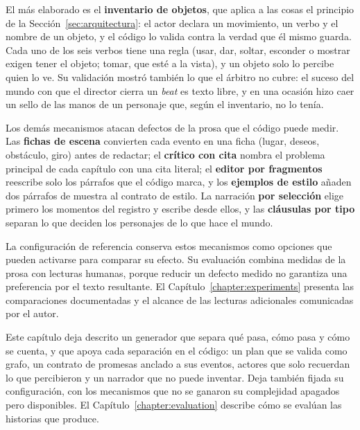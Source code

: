 El más elaborado es el \textbf{inventario de objetos}, que aplica a las cosas el principio de la
Sección~\ref{sec:arquitectura}: el actor declara un movimiento, un verbo y el nombre de un objeto, y
el código lo valida contra la verdad que él mismo guarda. Cada uno de los seis verbos tiene una
regla (usar, dar, soltar, esconder o mostrar exigen tener el objeto; tomar, que esté a la vista), y
un objeto solo lo percibe quien lo ve. Su validación mostró también lo que el árbitro no cubre: el
suceso del mundo con que el director cierra un \textit{beat} es texto libre, y en una ocasión hizo
caer un sello de las manos de un personaje que, según el inventario, no lo tenía.

Los demás mecanismos atacan defectos de la prosa que el código puede medir. Las \textbf{fichas de
escena} convierten cada evento en una ficha (lugar, deseos, obstáculo, giro) antes de redactar; el
\textbf{crítico con cita} nombra el problema principal de cada capítulo con una cita literal; el
\textbf{editor por fragmentos} reescribe solo los párrafos que el código marca, y los
\textbf{ejemplos de estilo} añaden dos párrafos de muestra al contrato de estilo. La narración
\textbf{por selección} elige primero los momentos del registro y escribe desde ellos, y las
\textbf{cláusulas por tipo} separan lo que deciden los personajes de lo que hace el mundo.

La configuración de referencia conserva estos mecanismos como opciones que pueden activarse para
comparar su efecto. Su evaluación combina medidas de la prosa con lecturas humanas, porque reducir
un defecto medido no garantiza una preferencia por el texto resultante. El
Capítulo~\ref{chapter:experiments} presenta las comparaciones documentadas y el alcance de las
lecturas adicionales comunicadas por el autor.

Este capítulo deja descrito un generador que separa qué pasa, cómo pasa y cómo se cuenta, y que
apoya cada separación en el código: un plan que se valida como grafo, un contrato de promesas
anclado a sus eventos, actores que solo recuerdan lo que percibieron y un narrador que no puede
inventar. Deja también fijada su configuración, con los mecanismos que no se ganaron su
complejidad apagados pero disponibles. El Capítulo~\ref{chapter:evaluation} describe cómo se evalúan
las historias que produce.

